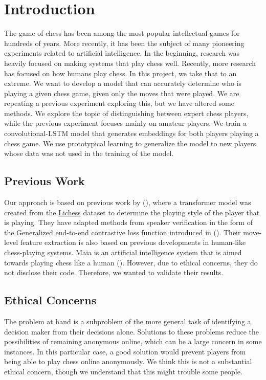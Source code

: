 \section{Introduction}
The game of chess has been among the most popular intellectual games for hundreds of years. More recently, it has been the subject of many pioneering experiments related to artificial intelligence. In the beginning, research was heavily focused on making systems that play chess well. Recently, more research has focused on how humans play chess.
In this project, we take that to an extreme. We want to develop a model that can accurately determine who is playing a given chess game, given only the moves that were played. We are repeating a previous experiment exploring this, but we have altered some methods. We explore the topic of distinguishing between expert chess players, while the previous experiment focuses mainly on amateur players.
We train a convolutional-LSTM model that generates embeddings for both players playing a chess game.
We use prototypical learning to generalize the model to new players whose data was not used in the training of the model. 

\subsection{Previous Work}
Our approach is based on previous work by
(\citealp{main_article}), where a transformer model was created from the \href{https://lichess.org/}{Lichess} dataset to determine the playing style of the player that is playing. They have adapted methods from speaker verification in the form of the Generalized end-to-end contrastive loss function introduced in (\citealp{ge2e}). Their move-level feature extraction is also based on previous developments in human-like chess-playing systems. Maia is an artificial intelligence system that is aimed towards playing chess like a human (\citealp{maia}). However, due to ethical concerns, they do not disclose their code. Therefore, we wanted to validate their results.

\subsection{Ethical Concerns}
The problem at hand is a subproblem of the more general task of identifying a decision maker from their decisions alone. Solutions to these problems reduce the possibilities of remaining anonymous online, which can be a large concern in some instances. In this particular case, a good solution would prevent players from being able to play chess online anonymously. We think this is not a substantial ethical concern, though we understand that this might trouble some people.